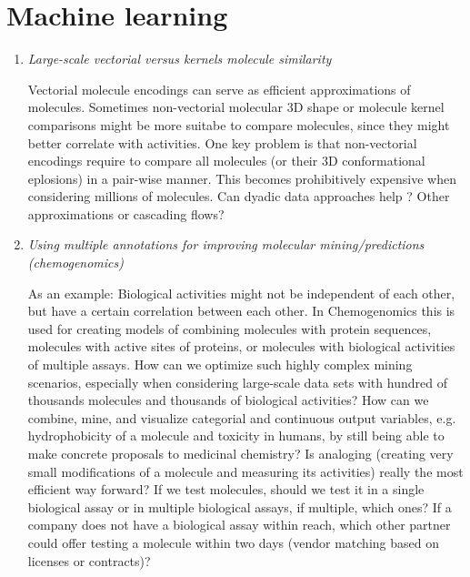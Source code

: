 \documentclass{sig-alternate}
\begin{document}
\section*{Machine learning}
\begin{enumerate}
\item \emph{Large-scale vectorial versus kernels molecule similarity}

  Vectorial molecule encodings can serve as efficient approximations
  of molecules.  Sometimes non-vectorial molecular 3D shape or
  molecule kernel comparisons might be more suitabe to compare
  molecules, since they might better correlate with activities. One
  key problem is that non-vectorial encodings require to compare all
  molecules (or their 3D conformational eplosions) in a pair-wise
  manner.  This becomes prohibitively expensive when considering
  millions of molecules.  Can dyadic data approaches help
  \cite{Hochreiter:2006:SVM:1159508.1159516}? Other approximations or
  cascading flows?
%
\item \emph{Using multiple annotations for improving molecular mining/predictions (chemogenomics)}

  As an example: Biological activities might not be independent of
  each other, but have a certain correlation between each other.  In
  Chemogenomics this is used for creating models of combining
  molecules with protein sequences, molecules with active sites of
  proteins, or molecules with biological activities of multiple
  assays. How can we optimize such highly complex mining scenarios,
  especially when considering large-scale data sets with hundred of
  thousands molecules and thousands of biological activities?  How can
  we combine, mine, and visualize categorial and continuous output
  variables, e.g. hydrophobicity of a molecule and toxicity in humans,
  by still being able to make concrete proposals to medicinal
  chemistry? Is analoging (creating very small modifications of a
  molecule and measuring its activities) really the most efficient way
  forward? If we test molecules, should we test it in a single
  biological assay or in multiple biological assays, if multiple,
  which ones?  If a company does not have a biological assay within
  reach, which other partner could offer testing a molecule within two
  days (vendor matching based on licenses or contracts)?
\end{enumerate} 
\end{document}
